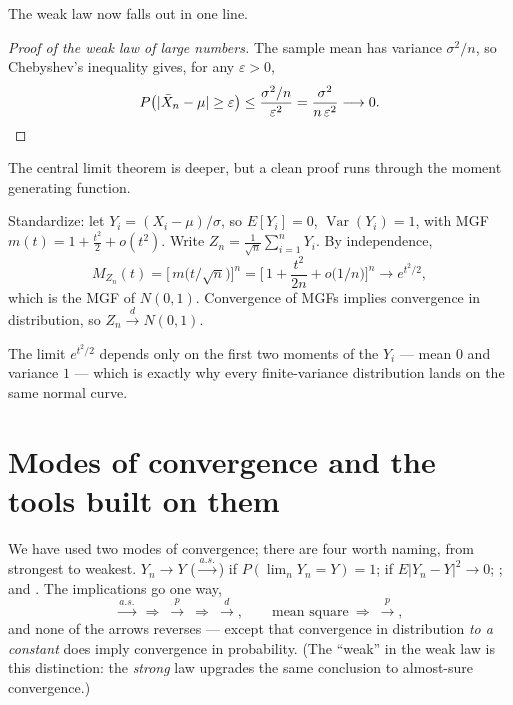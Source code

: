 \documentclass[11pt]{article}
\begin{document}
The weak law now falls out in one line.

\begin{proof}[Proof of the weak law of large numbers]
The sample mean has variance $\sigma^2/n$, so Chebyshev's inequality gives,
for any $\varepsilon > 0$,
\[
  P\big(|\bar X_n - \mu| \ge \varepsilon\big)
    \le \frac{\sigma^2/n}{\varepsilon^2}
    = \frac{\sigma^2}{n\,\varepsilon^2} \longrightarrow 0. \qedhere
\]
\end{proof}

The central limit theorem is deeper, but a clean proof runs through the
moment generating function.

\begin{theorem}
Standardize: let $Y_i = (X_i - \mu)/\sigma$, so $E[Y_i]=0$,
$\operatorname{Var}(Y_i)=1$, with MGF $m(t) = 1 + \tfrac{t^2}{2} + o(t^2)$.
Write $Z_n = \frac{1}{\sqrt n}\sum_{i=1}^n Y_i$. By independence,
\[
  M_{Z_n}(t) = \Big[\,m\!\big(t/\sqrt n\big)\Big]^{n}
             = \Big[\,1 + \frac{t^2}{2n} + o\!\big(1/n\big)\Big]^{n}
             \longrightarrow e^{t^2/2},
\]
which is the MGF of $N(0,1)$. Convergence of MGFs implies convergence in
distribution, so $Z_n \xrightarrow{d} N(0,1)$.
\end{theorem}

\noindent The limit $e^{t^2/2}$ depends only on the first two moments of the
$Y_i$ --- mean $0$ and variance $1$ --- which is exactly why every
finite-variance distribution lands on the same normal curve.

\section{Modes of convergence and the tools built on them}

We have used two modes of convergence; there are four worth naming, from
strongest to weakest. $Y_n \to Y$  ($\xrightarrow{a.s.}$)
if $P(\lim_n Y_n = Y) = 1$;  if
$E|Y_n - Y|^2 \to 0$; ; and .
The implications go one way,
\[
  \xrightarrow{a.s.} \ \Longrightarrow\ \xrightarrow{p}\ \Longrightarrow\ \xrightarrow{d},
  \qquad
  \text{mean square} \ \Longrightarrow\ \xrightarrow{p},
\]
and none of the arrows reverses --- except that convergence in distribution
\emph{to a constant} does imply convergence in probability. (The ``weak'' in
the weak law is this distinction: the \emph{strong} law upgrades the same
conclusion to almost-sure convergence.)
\end{document}
